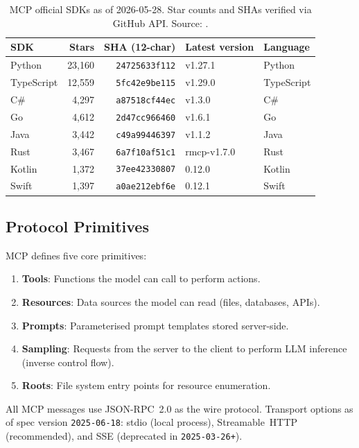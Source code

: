 \begin{table}[ht]
\centering
\begin{tabular}{lrrll}
\textbf{SDK} & \textbf{Stars} & \textbf{SHA (12-char)} & \textbf{Latest version} & \textbf{Language} \\
\hline
Python & 23,160 & \texttt{24725633f112} & v1.27.1 & Python \\
TypeScript & 12,559 & \texttt{5fc42e9be115} & v1.29.0 & TypeScript \\
C\# & 4,297 & \texttt{a87518cf44ec} & v1.3.0 & C\# \\
Go & 4,612 & \texttt{2d47cc966460} & v1.6.1 & Go \\
Java & 3,442 & \texttt{c49a99446397} & v1.1.2 & Java \\
Rust & 3,467 & \texttt{6a7f10af51c1} & rmcp-v1.7.0 & Rust \\
Kotlin & 1,372 & \texttt{37ee42330807} & 0.12.0 & Kotlin \\
Swift & 1,397 & \texttt{a0ae212ebf6e} & 0.12.1 & Swift \\
\end{tabular}
\caption{MCP official SDKs as of 2026-05-28.  Star counts and SHAs verified via
  GitHub API.  Source: \cite{mcp_ecosystem_deep}.}
\label{tab:mcp-sdks}
\end{table}

\subsection{Protocol Primitives}
\label{ssec:mcp-primitives}

MCP defines five core primitives:

\begin{enumerate}
  \item \textbf{Tools}: Functions the model can call to perform actions.
  \item \textbf{Resources}: Data sources the model can read (files, databases,
    APIs).
  \item \textbf{Prompts}: Parameterised prompt templates stored server-side.
  \item \textbf{Sampling}: Requests from the server to the client to perform
    LLM inference (inverse control flow).
  \item \textbf{Roots}: File system entry points for resource enumeration.
\end{enumerate}

All MCP messages use JSON-RPC~2.0 as the wire protocol.  Transport options
as of spec version \texttt{2025-06-18}: stdio (local process), Streamable~HTTP
(recommended), and SSE (deprecated in \texttt{2025-03-26+}).

